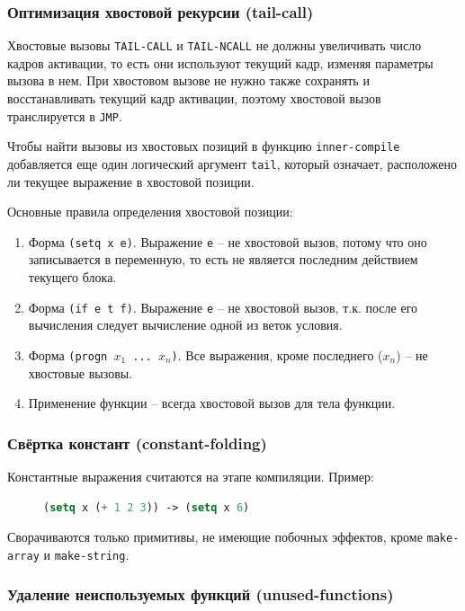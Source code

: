 \subsubsection{Оптимизация хвостовой рекурсии (tail-call)}

Хвостовые вызовы \texttt{TAIL-CALL} и \texttt{TAIL-NCALL} не должны увеличивать число кадров активации, то есть они используют текущий кадр, изменяя параметры вызова в нем. При хвостовом вызове не нужно также сохранять и восстанавливать текущий кадр активации, поэтому хвостовой вызов транслируется в \texttt{JMP}.

Чтобы найти вызовы из хвостовых позиций в функцию \texttt{inner-compile} добавляется еще один логический аргумент \texttt{tail}, который означает, расположено ли текущее выражение в хвостовой позиции.

Основные правила определения хвостовой позиции:

\begin{enumerate}
\item Форма \texttt{(setq x e)}. Выражение \texttt{e} -- не хвостовой вызов, потому что оно записывается в переменную, то есть не является последним действием текущего блока.
\item Форма \texttt{(if e t f)}. Выражение \texttt{e} -- не хвостовой вызов, т.к. после его вычисления следует вычисление одной из веток условия.
\item Форма \texttt{(progn $x_1$ ... $x_n$)}. Все выражения, кроме последнего ($x_n$) -- не хвостовые вызовы.
\item Применение функции -- всегда хвостовой вызов для тела функции.
\end{enumerate}


\subsubsection{Свёртка констант (constant-folding)}

Константные выражения считаются на этапе компиляции. Пример:

\begin{figure}[H]
\begin{lstlisting}[language=Lisp]
(setq x (+ 1 2 3)) -> (setq x 6)
\end{lstlisting}
\end{figure}

Сворачиваются только примитивы, не имеющие побочных эффектов, кроме \texttt{make-array} и \texttt{make-string}.


\subsubsection{Удаление неиспользуемых функций (unused-functions)}

